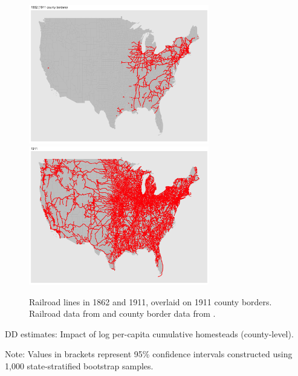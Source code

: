 \documentclass[12pt]{article}
\begin{document}
\begin{figure}[htbp]
	\begin{center}
		\includegraphics[width=0.7\textwidth]{plots/rr-1862.png} \\
		\includegraphics[width=0.7\textwidth]{plots/rr-1911.png} \\
	\end{center}
	\caption{Railroad lines in 1862 and 1911, overlaid on 1911 county borders. Railroad data from \cite{atack2013use} and county border data from \cite{long1995atlas}. \label{rr-map}} 
\end{figure}

\begin{table}[htbp]
	\begin{center}
				\caption{DD estimates: Impact of log per-capita cumulative homesteads (county-level). \label{dd-mechanisms}}
		\resizebox{.8\width}{!}{}
\end{center}
	\footnotesize{Note: Values in brackets represent 95\% confidence intervals constructed using 1,000 state-stratified bootstrap samples.}
\end{table}

\pagebreak





\itemize
\end{document}
